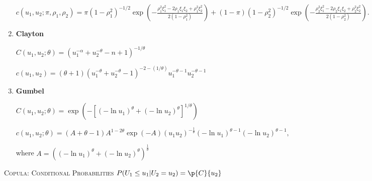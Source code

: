 \begin{enumerate}
$
c(u_1, u_2; \pi, \rho_1, \rho_2) = \pi (1 - \rho_1^2)^{-1/2} \exp \left( -\frac{\rho_1^2 \xi_1^2 - 2\rho_1 \xi_1 \xi_2 + \rho_1^2 \xi_2^2}{2(1 - \rho_1^2)} \right)
+ (1 - \pi)(1 - \rho_2^2)^{-1/2} \exp \left( -\frac{\rho_2^2 \xi_1^2 - 2\rho_2 \xi_1 \xi_2 + \rho_2^2 \xi_2^2}{2(1 - \rho_2^2)} \right) .
$

\item \textbf{Clayton}

$C(u_1, u_2; \theta) = \left( u_1^{-\alpha} + u_2^{-\theta} - n + 1 \right)^{-1/\theta} $

$c(u_1, u_2) = (\theta + 1) \left( u_1^{-\theta} + u_2^{-\theta} - 1 \right)^{-2 - (1/\theta)} u_1^{-\theta - 1} u_2^{-\theta - 1} $

\item \textbf{Gumbel}

$C(u_1, u_2; \theta) = \exp \left( -\left[ (-\ln u_1)^{\theta} + (-\ln u_2)^{\theta} \right]^{1/\theta} \right)$

$c(u_1, u_2; \theta) = (A + \theta - 1) A^{1 - 2\theta} \exp(-A) (u_1 u_2)^{-\frac{1}{\theta}} (-\ln u_1)^{\theta - 1} (-\ln u_2)^{\theta - 1} ,$

where $A = \left( (-\ln u_1)^{\theta} + (-\ln u_2)^{\theta} \right)^{\frac{1}{\theta}}$

\end{enumerate}

\Vhrulefill

\textsc{Copula: Conditional Probabilities $P(U_1 \leq u_1 | U_2 = u_2) = \p{C}{u_2}$}

